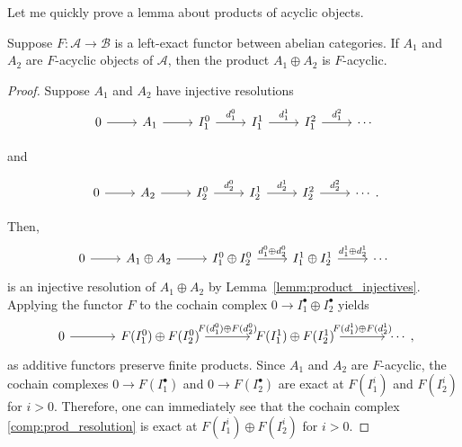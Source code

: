Let me quickly prove a lemma about products of acyclic objects.
\begin{lemm}\label{lemm:acyclic_prod}
  Suppose $F:\mathcal{A}\to\mathcal{B}$ is a left-exact functor between
  abelian categories. If $A_{1}$ and $A_{2}$ are $F$-acyclic objects of
  $\mathcal{A}$, then the product $A_{1}\oplus A_{2}$ is $F$-acyclic.
\end{lemm}
\begin{proof}
  Suppose $A_{1}$ and $A_{2}$ have injective resolutions
  \[\begin{tikzcd}
    0\rar & A_1\rar & I_1^0\rar{d_1^0} & I_1^1\rar{d_1^1} &
    I_1^2\rar{d_1^2} & \cdots
  \end{tikzcd}\]
  \begin{center}
    and
  \end{center}
  \[\begin{tikzcd}
    0\rar & A_2\rar & I_2^0\rar{d_2^0} & I_2^1\rar{d_2^1}
    & I_2^2\rar{d_2^2} & \cdots
  \end{tikzcd}.\]

  Then,
  \[\begin{tikzcd}
      0\rar & A_{1}\oplus A_{2}\rar & I_{1}^{0}\oplus I_{2}^{0}
      \rar{d_{1}^{0}\oplus d_{2}^{0}} & I_{1}^{1}\oplus I_{2}^{1}
      \rar{d_{1}^{1}\oplus d_{2}^{1}} & \cdots
    \end{tikzcd}\]
  is an injective resolution of $A_{1}\oplus A_{2}$ by
  Lemma~\ref{lemm:product_injectives}. Applying the functor $F$ to the
  cochain complex $0\to I_{1}^{\bullet}\oplus I_{2}^{\bullet}$ yields
  \begin{equation}\label{comp:prod_resolution}
    \begin{tikzcd}[column sep=large]
      0\rar & F(I_{1}^{0})\oplus F(I_{2}^{0})
      \rar{F(d_{1}^{0})\oplus F(d_{2}^{0})} & F(I_{1}^{1})\oplus F(I_{2}^{1})
      \rar{F(d_{1}^{1})\oplus F(d_{2}^{1})} & \cdots
    \end{tikzcd},
  \end{equation}
  as additive functors preserve finite products. Since $A_{1}$ and $A_{2}$
  are $F$-acyclic, the cochain complexes $0\to F\left(I_{1}^{\bullet}\right)$
  and $0\to F\left(I_{2}^{\bullet}\right)$ are exact at
  $F\left(I_{1}^{i}\right)$ and $F\left(I_{2}^{i}\right)$ for $i>0$.
  Therefore, one can immediately see that the cochain complex
  \eqref{comp:prod_resolution} is exact at
  $F\left(I_{1}^{i}\right)\oplus F\left(I_{2}^{i}\right)$ for $i>0$.
\end{proof}

